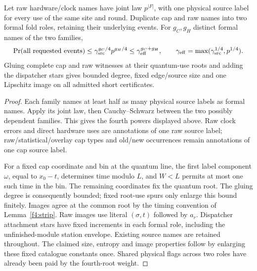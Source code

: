 \begin{lemma}\label{f4:mixed}
Let raw hardware/clock names have joint law \(p^{|F|}\), with
one physical source label for every use of the same site and round. Duplicate
cap and raw names into two formal fold roles, retaining their underlying
events. For \(g_C,g_H\) distinct formal names of the two families,
\[
 \Pr(\textup{all requested events})
 \le\gamma_{\rm src}^{g_C/4}p^{g_H/4}
 \le\gamma_{\rm eff}^{g_C+g_H},\qquad
 \gamma_{\rm eff}=\max(\gamma_{\rm src}^{1/4},p^{1/4}).
\]
Gluing complete cap and raw witnesses at their quantum-use
roots and adding the dispatcher stars gives bounded degree, fixed
edge/source size and one Lipschitz image on all admitted short
certificates.
\end{lemma}
\begin{proof}
Each family names at least half as many physical source labels as formal names.
Apply its joint law, then Cauchy--Schwarz between the two possibly
dependent families. This gives the fourth powers displayed above.
Raw clock errors and direct hardware uses are annotations of one
raw source label; raw/statistical/overlay cap types and old/new occurrences
remain annotations of one cap source label.

For a fixed cap coordinate and bin at the quantum line, the first label component \(\omega\), equal to \(x_0-t\),
determines time modulo \(L\), and \(W<L\) permits at most one such
time in the bin. The remaining coordinates fix the quantum root.
The gluing degree is consequently bounded; fixed root-use spurs only
enlarge this bound finitely. Images agree at the common root by the
timing convention of Lemma~\ref{f4:strip}. Raw images use literal
\((\sigma,t)\) followed by \(a_r\). Dispatcher attachment stars have
fixed increments in each formal role, including the unfinished-module
station envelope. Existing source names are retained throughout.
The claimed size, entropy and image properties follow by enlarging
these fixed catalogue constants once. Shared physical flags across
two roles have already been paid by the fourth-root weight.
\end{proof}

